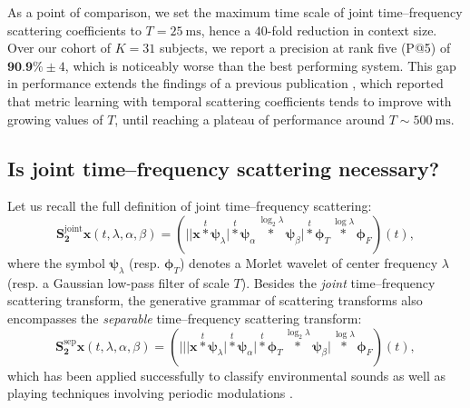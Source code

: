 \documentclass{bmcart}
\begin{document}
As a point of comparison, we set the maximum time scale of joint time--frequency scattering coefficients to $T=\SI{25}{\milli\second}$, hence a $40$-fold reduction in context size.
Over our cohort of $K=31$ subjects, we report a precision at rank five (P@5) of $\textbf{90.9\%} \pm 4$, which is noticeably worse than the best performing system.
This gap in performance extends the findings of a previous publication \cite{lostanlen2018extended}, which reported that metric learning with temporal scattering coefficients tends to improve with growing values of $T$, until reaching a plateau of performance around $T\sim\SI{500}{\milli\second}$.


\subsection*{Is joint time--frequency scattering necessary?}

Let us recall the full definition of joint time--frequency scattering:
\begin{equation}
\mathbf{S_2^{\mathrm{joint}}}\boldsymbol{x}(t,\lambda,\alpha,\beta) = 
\left(
\Big\vert
\big\vert
\boldsymbol{x} \overset{t}{\ast} \boldsymbol{\psi}_{\lambda}
\big\vert
\overset{t}{\ast}
\boldsymbol{\psi}_{\alpha}
\overset{\log_2 \lambda}{\ast}
\boldsymbol{\psi}_{\beta}
\Big\vert
\overset{t}{\ast} \boldsymbol{\phi}_{T}
\overset{\log \lambda}{\ast} \boldsymbol{\phi}_{F}\right)(t),
\label{eq:joint-scattering}
\end{equation}
where the symbol $\boldsymbol{\psi}_{\lambda}$ (resp. $\boldsymbol{\phi}_T$) denotes a Morlet wavelet of center frequency $\lambda$ (resp. a Gaussian low-pass filter of scale $T$).
Besides the \emph{joint} time--frequency scattering transform, the generative grammar of scattering transforms \cite{lostanlen2019chapter} also encompasses the \emph{separable} time--frequency scattering transform:
\begin{equation}
\mathbf{S_2^{\mathrm{sep}}}\boldsymbol{x}(t,\lambda,\alpha,\beta) = 
\left(
\bigg\vert
\Big\vert
\big\vert
\boldsymbol{x} \overset{t}{\ast} \boldsymbol{\psi}_{\lambda}
\big\vert
\overset{t}{\ast}
\boldsymbol{\psi}_{\alpha}
\Big\vert
\overset{t}{\ast} \boldsymbol{\phi}_{T}
\overset{\log_2 \lambda}{\ast}
\boldsymbol{\psi}_{\beta}
\bigg\vert
\overset{\log \lambda}{\ast} \boldsymbol{\phi}_{F}
\right)(t),
\label{eq:separable-scattering}
\end{equation}
which has been applied successfully to classify environmental sounds \cite{bauge2013icassp} as well as playing techniques involving periodic modulations \cite{wang2019ismir}.
\end{document}
